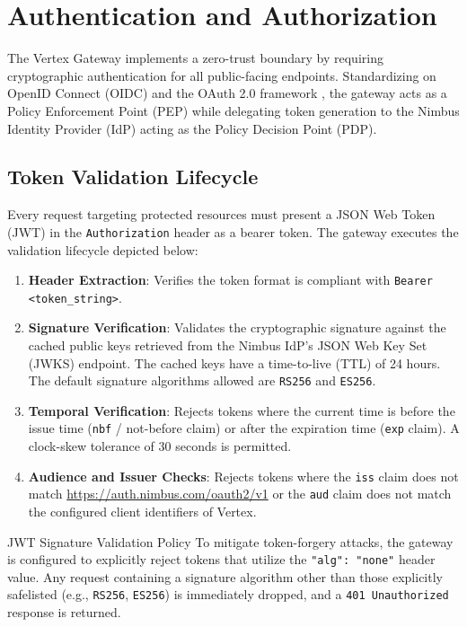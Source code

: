 \section{Authentication and Authorization}
\label{sec:auth_oauth}

The Vertex Gateway implements a zero-trust boundary by requiring cryptographic authentication for all public-facing endpoints. Standardizing on OpenID Connect (OIDC) and the OAuth 2.0 framework \cite{rfc6749}, the gateway acts as a Policy Enforcement Point (PEP) while delegating token generation to the Nimbus Identity Provider (IdP) acting as the Policy Decision Point (PDP).

\subsection{Token Validation Lifecycle}
Every request targeting protected resources must present a JSON Web Token (JWT) \cite{rfc7519} in the \texttt{Authorization} header as a bearer token. The gateway executes the validation lifecycle depicted below:

\begin{enumerate}
    \item \textbf{Header Extraction}: Verifies the token format is compliant with \texttt{Bearer <token\_string>}.
    \item \textbf{Signature Verification}: Validates the cryptographic signature against the cached public keys retrieved from the Nimbus IdP's JSON Web Key Set (JWKS) endpoint. The cached keys have a time-to-live (TTL) of 24 hours. The default signature algorithms allowed are \texttt{RS256} and \texttt{ES256}.
    \item \textbf{Temporal Verification}: Rejects tokens where the current time is before the issue time (\texttt{nbf} / not-before claim) or after the expiration time (\texttt{exp} claim). A clock-skew tolerance of 30 seconds is permitted.
    \item \textbf{Audience and Issuer Checks}: Rejects tokens where the \texttt{iss} claim does not match \url{https://auth.nimbus.com/oauth2/v1} or the \texttt{aud} claim does not match the configured client identifiers of Vertex.
\end{enumerate}

\begin{securitynote}{JWT Signature Validation Policy}
To mitigate token-forgery attacks, the gateway is configured to explicitly reject tokens that utilize the \texttt{"alg": "none"} header value. Any request containing a signature algorithm other than those explicitly safelisted (e.g., \texttt{RS256}, \texttt{ES256}) is immediately dropped, and a \texttt{401 Unauthorized} response is returned.
\end{securitynote}

